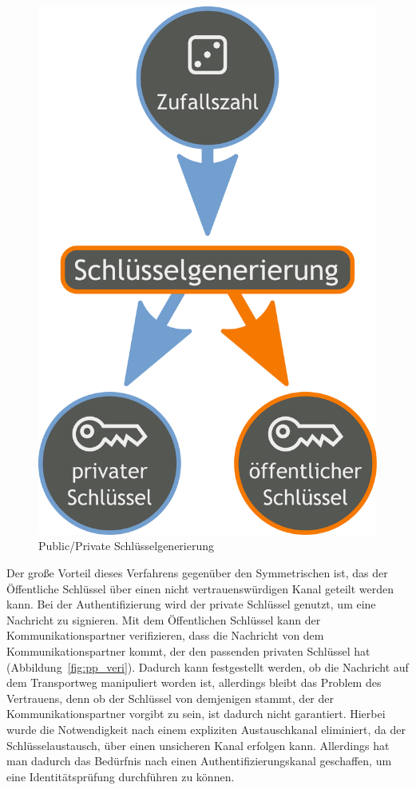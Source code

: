 \documentclass[11pt,a4paper]{report}
\begin{document}
\begin{figure}[htbp]
\centering
\includegraphics[scale=0.2]{images/public_private_keygeneration.pdf}
\caption{Public/Private Schlüsselgenerierung \cite{wiki_asym_crypto}}
\label{fig:pp_keygen}
\end{figure}

Der große Vorteil dieses Verfahrens gegenüber den Symmetrischen ist, das der Öffentliche Schlüssel über einen nicht vertrauenswürdigen Kanal geteilt werden kann. Bei der Authentifizierung wird der private Schlüssel genutzt, um eine Nachricht zu signieren. Mit dem Öffentlichen Schlüssel kann der Kommunikationspartner verifizieren, dass die Nachricht von dem Kommunikationspartner kommt, der den passenden privaten Schlüssel hat (Abbildung~\ref{fig:pp_veri}). Dadurch kann festgestellt werden, ob die Nachricht auf dem Transportweg manipuliert worden ist, allerdings bleibt das Problem des Vertrauens, denn ob der Schlüssel von demjenigen stammt, der der Kommunikationspartner vorgibt zu sein, ist dadurch nicht garantiert. Hierbei wurde die Notwendigkeit nach einem expliziten Austauschkanal eliminiert, da der Schlüsselaustausch, über einen unsicheren Kanal erfolgen kann. Allerdings hat man dadurch das Bedürfnis nach einen Authentifizierungskanal geschaffen, um eine Identitätsprüfung durchführen zu können.
 
\end{document}

